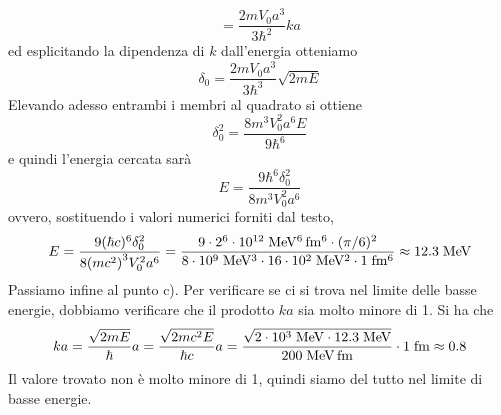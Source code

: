 \begin{soluzione}
\begin{equation*}
      =\frac{2 m V_0 a^3}{3 \hbar^2} ka
   \end{equation*}
   ed esplicitando la dipendenza di $k$ dall'energia otteniamo
   \begin{equation*}
      \delta_0
      =\frac{2 m V_0 a^3}{3 \hbar^3} \sqrt{2mE}
   \end{equation*}
   Elevando adesso entrambi i membri al quadrato si ottiene
   \begin{equation*}
      \delta_0^2
      =\frac{8 m^3 V_0^2 a^6 E}{9 \hbar^6}
   \end{equation*}
   e quindi l'energia cercata sarà
   \begin{equation*}
      E
      =\frac{9 \hbar^6 \delta_0^2}{8 m^3 V_0^2 a^6}
   \end{equation*}
   ovvero, sostituendo i valori numerici forniti dal testo,
   \begin{equation*}
      E
      =\frac{9 (\hbar c)^6 \delta_0^2}{8 {(mc^2)}^3 V_0^2 a^6}
      =\rm \frac{9 \cdot 2^6 \cdot 10^{12} \; MeV^6 \, fm^6 \cdot (\pi/6)^2}{8 \cdot 10^9 \; MeV^3 \cdot 16 \cdot 10^2 \; MeV^2 \cdot 1 \; fm^6}
      \approx 12.3 \rm \; MeV
   \end{equation*}
   Passiamo infine al punto c). Per verificare se ci si trova nel limite delle basse energie, dobbiamo verificare che il prodotto $ka$ sia molto minore di 1. Si ha che
   \begin{equation*}
      ka
      =\frac{\sqrt{2mE}}{\hbar} a
      =\frac{\sqrt{2 mc^2 E}}{\hbar c} a
      =\rm \frac{\sqrt{2 \cdot 10^3 \; MeV \cdot 12.3 \; MeV}}{200 \; MeV \, fm} \cdot 1 \; fm
      \approx 0.8
   \end{equation*}
   Il valore trovato non è molto minore di 1, quindi siamo del tutto nel limite di basse energie.
\end{soluzione}

\newpage
\setcounter{equation}{0}

